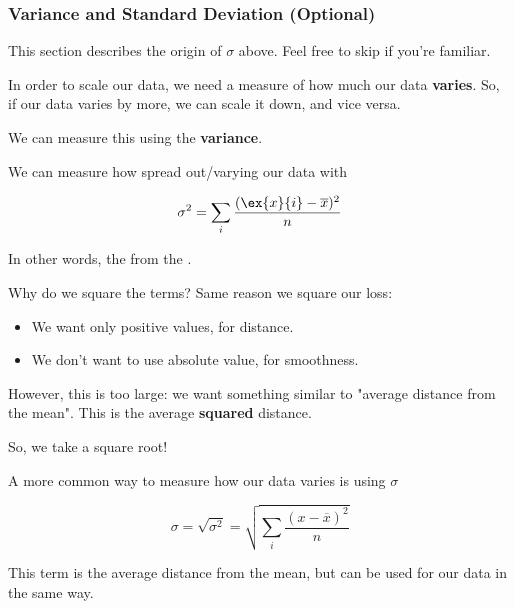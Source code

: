             \subsecdiv

            \subsubsection{Variance and Standard Deviation (Optional)}

                This section describes the origin of $\sigma$ above. Feel free to skip if you're familiar.

                In order to scale our data, we need a measure of how much our data \textbf{varies}. So, if our data varies by more, we can scale it down, and vice versa.

                We can measure this using the \textbf{variance}.\\

                \begin{definition}
                    We can measure how spread out/varying our data with 

                    \begin{equation}
                        \sigma^2 = \sum_i \frac{ (\ex{x}{i} - \overline{x})^2 }{n}
                    \end{equation}

                    In other words, the  from the .
                \end{definition}

                Why do we square the terms? Same reason we square our loss:

                \begin{itemize}
                    \item We want only positive values, for distance.
                    \item We don't want to use absolute value, for smoothness.
                \end{itemize}

                However, this is too large: we want something similar to "average distance from the mean". This is the average \textbf{squared} distance.

                So, we take a square root!\\

                \begin{definition}
                    A more common way to measure how our data varies is using  $\sigma$

                    \begin{equation*}
                        \sigma = \sqrt{\sigma^2}
                        = \sqrt{ \sum_i \frac{ (x - \overline{x})^2 }{n} }
                    \end{equation*}

                    This term is  the average distance from the mean, but can be used for  our data in the same way.
                \end{definition}

